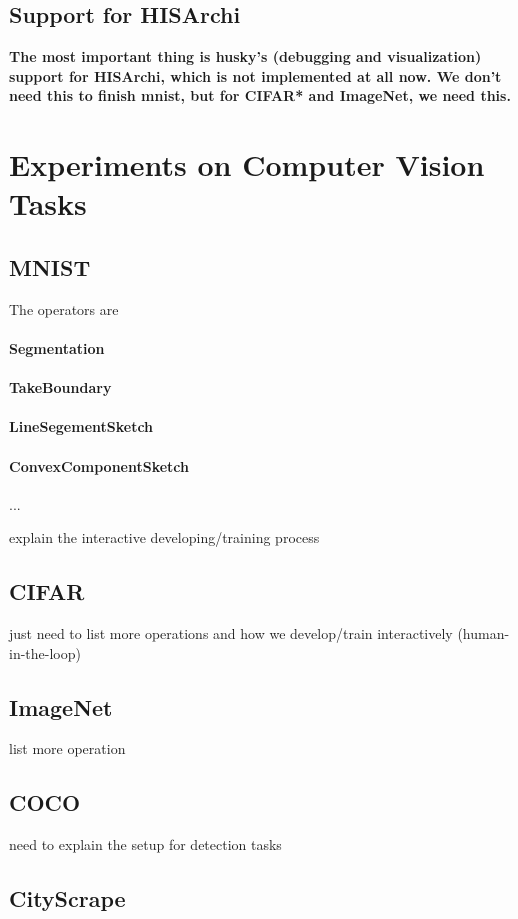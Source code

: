 \documentclass[10pt, oneside]{article}   	%
\theoremstyle{definition}
\begin{document}
\subsection{Support for HISArchi}

\textbf{The most important thing is husky's (debugging and visualization) support for HISArchi, which is not implemented at all now. We don't need this to finish mnist, but for CIFAR* and ImageNet, we need this.}
\section{Experiments on Computer Vision Tasks}
\subsection{MNIST}
The operators are
\paragraph{Segmentation}
\paragraph{TakeBoundary}
\paragraph{LineSegementSketch}
\paragraph{ConvexComponentSketch}

...

explain the interactive developing/training process
\subsection{CIFAR}
just need to list more operations and how we develop/train interactively (human-in-the-loop)
\subsection{ImageNet}list more operation
\subsection{COCO}
need to explain the setup for detection tasks
\subsection{CityScrape}
\end{document}
